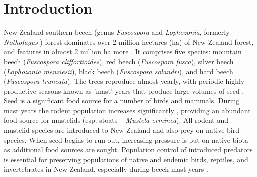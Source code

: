 \documentclass[remotesensing,article,submit,moreauthors,pdftex]{Definitions/mdpi}
\begin{document}

\newcommand{\dndyi}{$\Delta\text{NDYI}$}
\section{Introduction}
New Zealand southern beech (genus \emph{Fuscospora} and \emph{Lophozonia}, formerly \emph{Nothofagus} \citep{Heenan2013}) forest dominates over 2 million hectares (ha) of New Zealand forest, and features in almost 2 million ha more \citep{Shepherd2005}. It comprises five species: mountain beech (\emph{Fuscospora cliffortioides}), red beech (\emph{Fuscospora fusca}), silver beech (\emph{Lophozonia menziesii}), black beech (\emph{Fuscospora solandri}), and hard beech (\emph{Fuscospora truncata}). The trees reproduce almost yearly, with periodic highly productive seasons known as 'mast' years that produce large volumes of seed \citep{Wardle1984}. Seed is a significant food source for a number of birds and mammals. During mast years the rodent population increases significantly \citep{Elliott2016,Ruscoe2010}, providing an abundant food source for mustelids (esp. stoats -- \emph{Mustela erminea})\citep{King2011}. All rodent and mustelid species are introduced to New Zealand and also prey on native bird species. When seed begins to run out, increasing pressure is put on native biota as additional food sources are sought. Population control of introduced predators is essential for preserving populations of native and endemic birds, reptiles, and invertebrates in New Zealand, especially during beech mast years \citep{King2011}.
\end{document}
